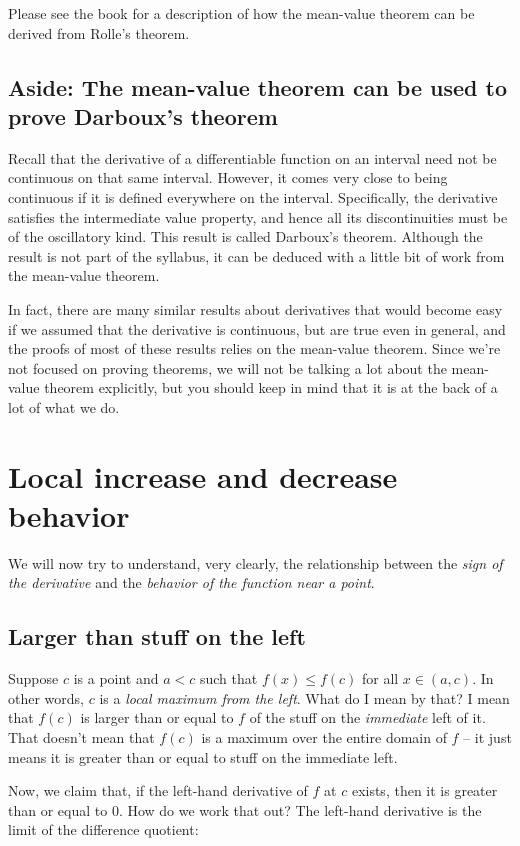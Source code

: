 \documentclass{amsart}
\begin{document}
Please see the book for a description of how the mean-value theorem
can be derived from Rolle's theorem.

\subsection*{Aside: The mean-value theorem can be used to prove Darboux's theorem}

Recall that the derivative of a differentiable function on an interval
need not be continuous on that same interval. However, it comes very
close to being continuous if it is defined everywhere on the
interval. Specifically, the derivative satisfies the intermediate
value property, and hence all its discontinuities must be of the
oscillatory kind. This result is called Darboux's theorem. Although
the result is not part of the syllabus, it can be deduced with a
little bit of work from the mean-value theorem.

In fact, there are many similar results about derivatives that would
become easy if we assumed that the derivative is continuous, but are
true even in general, and the proofs of most of these results relies
on the mean-value theorem. Since we're not focused on proving
theorems, we will not be talking a lot about the mean-value theorem
explicitly, but you should keep in mind that it is at the back of a
lot of what we do.
\section{Local increase and decrease behavior}

We will now try to understand, very clearly, the relationship between
the {\em sign of the derivative} and the {\em behavior of the function
near a point}.

\subsection{Larger than stuff on the left}

Suppose $c$ is a point and $a < c$ such that $f(x) \le f(c)$ for all
$x \in (a,c)$. In other words, $c$ is a {\em local maximum from the
left}. What do I mean by that? I mean that $f(c)$ is larger than or
equal to $f$ of the stuff on the {\em immediate} left of it. That
doesn't mean that $f(c)$ is a maximum over the entire domain of $f$ --
it just means it is greater than or equal to stuff on the immediate
left.

Now, we claim that, if the left-hand derivative of $f$ at $c$ exists,
then it is greater than or equal to $0$. How do we work that out? The
left-hand derivative is the limit of the difference quotient:
\end{document}
